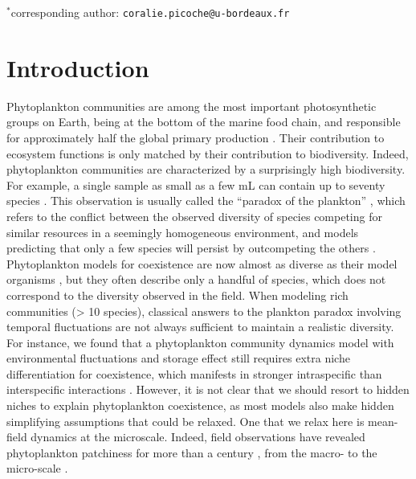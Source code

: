 \documentclass[english]{article}
\begin{document}
$^{*}$corresponding author: \verb|coralie.picoche@u-bordeaux.fr|

\doublespacing

\clearpage{}


\section*{Introduction}

Phytoplankton communities are among the most important photosynthetic
groups on Earth, being at the bottom of the marine food chain, and
responsible for approximately half the global primary production \citep{field_primary_1998}.
Their contribution to ecosystem functions is only matched by their
contribution to biodiversity. Indeed, phytoplankton communities are
characterized by a surprisingly high biodiversity. For example, a
single sample as small as a few mL can contain up to seventy species
\citep{REPHY_db,widdicombe_2021}. This observation is usually called
the ``paradox of the plankton'' \citep{hutchinson_paradox_1961},
which refers to the conflict between the observed diversity of species
competing for similar resources in a seemingly homogeneous environment,
and models predicting that only a few species will persist by outcompeting
the others \citep{macarthur_competition_1964,huisman_biodiversity_1999,schippers_does_2001}.
Phytoplankton models for coexistence are now almost as diverse as
their model organisms \citep{record_paradox_2014}, but they often
describe only a handful of species, which does not correspond to the
diversity observed in the field. When modeling rich communities (\textgreater{}
10 species), classical answers to the plankton paradox involving temporal
fluctuations \citep[e.g.,][]{li_effects_2016,chesson_updates_2018}
are not always sufficient to maintain a realistic diversity. For instance,
we found that a phytoplankton community dynamics model with environmental
fluctuations and storage effect still requires extra niche differentiation
for coexistence, which manifests in stronger intraspecific than interspecific
interactions \citep{picoche_how_2019}. However, it is not clear
that we should resort to hidden niches to explain phytoplankton coexistence,
as most models also make hidden simplifying assumptions that could
be relaxed. One that we relax here is mean-field dynamics at the microscale.
Indeed, field observations have revealed phytoplankton patchiness
for more than a century \citep{bainbridge_size_1957,stocker_marine_2012},
from the macro- to the micro-scale \citep{leonard_interannual_2001,doubell_high-resolution_2006,font-munoz_advection_2017}.
\end{document}

